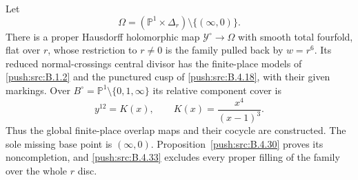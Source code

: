 \begin{proposition}\hypertarget{tag-030N}{}\label{push:src:B.4.19}
\label{push:B419}

Let
\[
 \Omega=(\mathbb P^1\times\Delta_r)
                  \setminus\{(\infty,0)\}.
\]
There is a proper Hausdorff holomorphic map
$\mathcal Y^\circ\to\Omega$ with smooth total fourfold,
flat over $r$, whose restriction to $r\ne0$ is the
family pulled back by $w=r^6$. Its reduced
normal-crossings central divisor has the finite-place
models of \ref{push:src:B.1.2} and the punctured cusp of
\ref{push:src:B.4.18}, with their given markings. Over
$B^\circ=\mathbb P^1\setminus\{0,1,\infty\}$ its
relative component cover is
\[
 y^{12}=K(x),\qquad K(x)=\frac{x^4}{(x-1)^3}.
\]
Thus the global finite-place overlap maps and their
cocycle are constructed. The sole missing base point is $(\infty,0)$.
Proposition~\ref{push:src:B.4.30} proves its noncompletion, and
\ref{push:src:B.4.33} excludes every proper filling of the 
family over the whole $r$ disc.
\end{proposition}



